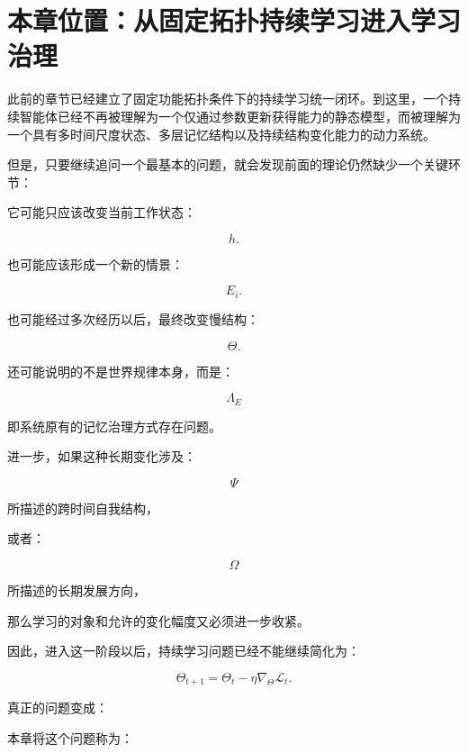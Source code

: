 \section{本章位置：从固定拓扑持续学习进入学习治理}

此前的章节已经建立了固定功能拓扑条件下的持续学习统一闭环。到这里，一个持续智能体已经不再被理解为一个仅通过参数更新获得能力的静态模型，而被理解为一个具有多时间尺度状态、多层记忆结构以及持续结构变化能力的动力系统。

但是，只要继续追问一个最基本的问题，就会发现前面的理论仍然缺少一个关键环节：

\begin{statementbox}
\centering
{}
\end{statementbox}

它可能只应该改变当前工作状态：

\[
h.
\]

也可能应该形成一个新的情景：

\[
E_i.
\]

也可能经过多次经历以后，最终改变慢结构：

\[
\Theta.
\]

还可能说明的不是世界规律本身，而是：

\[
\Lambda_E
\]

即系统原有的记忆治理方式存在问题。

进一步，如果这种长期变化涉及：

\[
\Psi
\]

所描述的跨时间自我结构，

或者：

\[
\Omega
\]

所描述的长期发展方向，

那么学习的对象和允许的变化幅度又必须进一步收紧。

因此，进入这一阶段以后，持续学习问题已经不能继续简化为：

\[
\Theta_{t+1}
=
\Theta_t-\eta\nabla_{\Theta}\mathcal L_t.
\]

真正的问题变成：

\begin{statementbox}
\centering
{}
\end{statementbox}

本章将这个问题称为：

\begin{statementbox}
\centering
{}
\end{statementbox}

